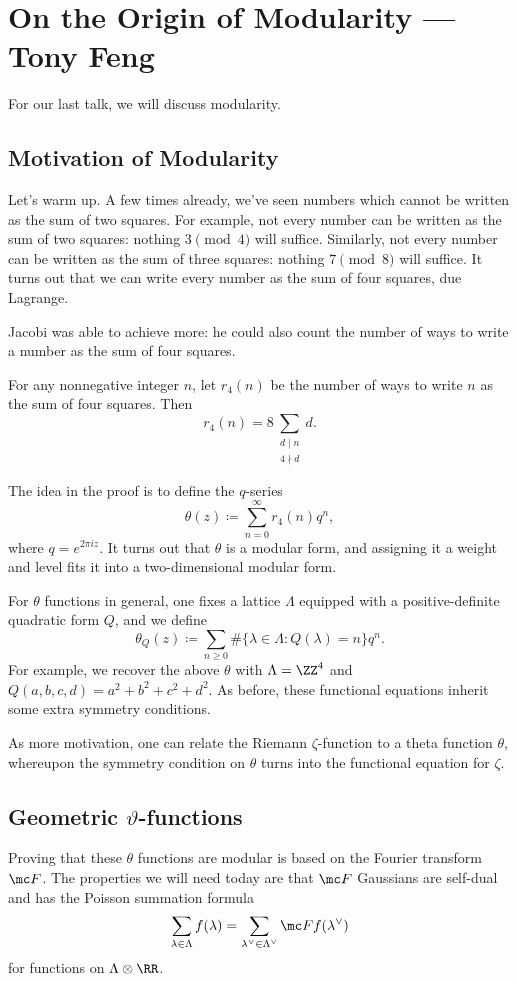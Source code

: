 \documentclass{article}
\begin{document}
\section{On the Origin of Modularity --- Tony Feng}
For our last talk, we will discuss modularity.

\subsection{Motivation of Modularity}
Let's warm up. A few times already, we've seen numbers which cannot be written as the sum of two squares. For example, not every number can be written as the sum of two squares: nothing $3\pmod4$ will suffice. Similarly, not every number can be written as the sum of three squares: nothing $7\pmod8$ will suffice. It turns out that we can write every number as the sum of four squares, due Lagrange.

Jacobi was able to achieve more: he could also count the number of ways to write a number as the sum of four squares.
\begin{theorem}[Jacobi]
	For any nonnegative integer $n$, let $r_4(n)$ be the number of ways to write $n$ as the sum of four squares. Then
	\[r_4(n)=8\sum_{\substack{d\mid n\\4\nmid d}}d.\]
\end{theorem}
The idea in the proof is to define the $q$-series
\[\theta(z)\coloneqq\sum_{n=0}^\infty r_4(n)q^n,\]
where $q=e^{2\pi iz}$. It turns out that $\theta$ is a modular form, and assigning it a weight and level fits it into a two-dimensional modular form.

For $\theta$ functions in general, one fixes a lattice $\Lambda$ equipped with a positive-definite quadratic form $Q$, and we define
\[\theta_Q(z)\coloneqq\sum_{n\ge0}\#\{\lambda\in\Lambda:Q(\lambda)=n\}q^n.\]
For example, we recover the above $\theta$ with $\Lambda=\ZZ^4$ and $Q(a,b,c,d)=a^2+b^2+c^2+d^2$. As before, these functional equations inherit some extra symmetry conditions.
\begin{remark}
	As more motivation, one can relate the Riemann $\zeta$-function to a theta function $\theta$, whereupon the symmetry condition on $\theta$ turns into the functional equation for $\zeta$.
\end{remark}

\subsection{Geometric \texorpdfstring{$\vartheta$}{ Theta}-functions}
Proving that these $\theta$ functions are modular is based on the Fourier transform $\mc F$. The properties we will need today are that $\mc F$ Gaussians are self-dual and has the Poisson summation formula
\[\sum_{\lambda\in\Lambda}f(\lambda)=\sum_{\lambda^\lor\in\Lambda^\lor}\mc Ff(\lambda^\lor)\]
for functions on $\Lambda\otimes\RR$.
\end{document}
